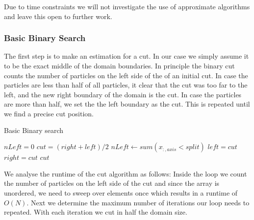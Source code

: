 \documentclass[]{article}
\begin{document}
 Due to time constraints we will not investigate the use of approximate algorithms and leave this open to further work.

\subsubsection{Basic Binary Search}

The first step is to make an estimation for a cut. In our case we simply assume it to be the exact middle of the domain boundaries. In principle the binary cut counts the number of particles on the left side of the of an initial cut. In case the particles are less than half of all particles, it clear that the cut was too far to the left, and the new right boundary of the domain is the cut. In case the particles are more than half, we set the the left boundary as the cut. This is repeated until we find a precise cut position.




\begin{algorithm}[H]
	\caption{Basic Binary search}\label{algo:cut}
	\begin{algorithmic}[1]
		\State $nLeft = 0$
		\newline
		\State $cut = (right + left ) / 2 $
		\State $nLeft\gets sum(x_{:,axis} < split)$
		\newline
		\State $left = cut$
		\Else 
		\State $right = cut$
		\EndIf
		\newline
		\EndWhile\label{euclidendwhile}
		\State \Return $cut$
		\EndProcedure
	\end{algorithmic}
\end{algorithm}

We analyse the runtime of the cut algorithm as follows: Inside the loop we count the number of particles on the left side of the cut and since the array is unordered, we need to sweep over elements once which results in a runtime of $O(N)$. Next we determine the maximum number of iterations our loop needs to repeated. With each iteration we cut in half the domain size.  
\end{document}
